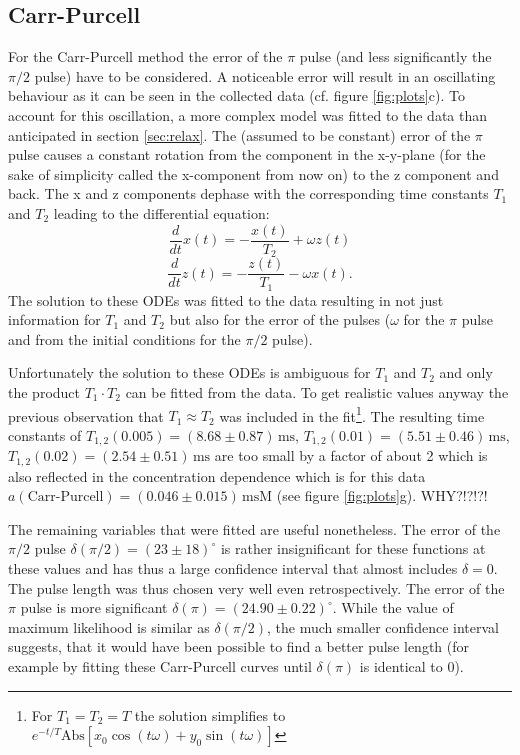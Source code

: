 \documentclass[a4paper]{scrartcl}
\numberwithin{equation}{section}
\numberwithin{figure}{section}
\numberwithin{table}{section}
\newcommand{\eq}[2]{\begin{equation}#1\label{#2}\end{equation}}
\begin{document}
\subsection{Carr-Purcell}
For the Carr-Purcell method the error of the $\pi$ pulse (and less significantly the $\pi/2$ pulse) have to be considered. A noticeable error will result in an oscillating behaviour as it can be seen in the collected data (cf. figure \ref{fig:plots}c). To account for this oscillation, a more complex model was fitted to the data than anticipated in section \ref{sec:relax}. The (assumed to be constant) error of the $\pi$ pulse causes a constant rotation from the component in the x-y-plane (for the sake of simplicity called the x-component from now on) to the z component and back. The x and z components dephase with the corresponding time constants $T_1$ and $T_2$ leading to the differential equation:
\eq{\frac{d}{dt}x(t) = -\frac{x(t)}{T_2} + \omega z(t)}{}
\eq{\frac{d}{dt}z(t) = -\frac{z(t)}{T_1} - \omega x(t) .}{}
The solution to these ODEs was fitted to the data resulting in not just information for $T_1$ and $T_2$ but also for the error of the pulses ($\omega$ for the $\pi$ pulse and from the initial conditions for the $\pi/2$ pulse).

Unfortunately the solution to these ODEs is ambiguous for $T_1$ and $T_2$ and only the product $T_1 \cdot T_2$ can be fitted from the data. To get realistic values anyway the previous observation that $T_1 \approx T_2$ was included in the fit\footnote{For $T_1=T_2=T$ the solution simplifies to $e^{-t/T} \text{Abs}[x_0 \cos(t \omega )+y_0 \sin(t \omega )]$}. The resulting time constants of $T_{1,2}(0.005)=(8.68\pm0.87)\,\text{ms}$, $T_{1,2}(0.01)=(5.51\pm 0.46)\,\text{ms}$, $T_{1,2}(0.02)=(2.54\pm 0.51)\,\text{ms}$ are too small by a factor of about 2 which is also reflected in the concentration dependence which is for this data $a(\text{Carr-Purcell})=(0.046\pm 0.015)\,\text{msM}$ (see figure \ref{fig:plots}g). WHY?!?!?!

The remaining variables that were fitted are useful nonetheless. The error of the $\pi/2$ pulse $\delta(\pi/2) = (23 \pm 18)^\circ$ is rather insignificant for these functions at these values and has thus a large confidence interval that almost includes $\delta = 0$. The pulse length was thus chosen very well even retrospectively. The error of the $\pi$ pulse is more significant $\delta(\pi)=(24.90\pm 0.22)^\circ$. While the value of maximum likelihood is similar as $\delta(\pi/2)$, the much smaller confidence interval suggests, that it would have been possible to find a better pulse length (for example by fitting these Carr-Purcell curves until $\delta(\pi)$ is identical to 0). 


\FloatBarrier
\clearpage
 

\end{document}
